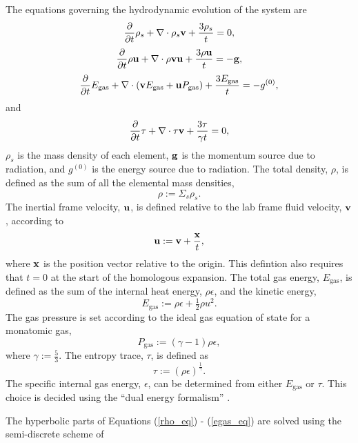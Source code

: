 \documentclass[preprint]{aastex62}
\newcommand{\pderiv}[2]{\frac{\partial}{\partial #2} #1}
\newcommand{\vect}[1]{{\bf #1}}
\newcommand{\diverg}[1]{ \vect{\nabla} \cdot #1 }
\newcommand{\eqs}[2]{Equations (\ref{#1}) - (\ref{#2})}
\begin{document}
The equations governing the hydrodynamic evolution of the system are
\begin{equation}
\label{rho_eq}
\pderiv{\rho_s}{t} + \diverg{\rho_s \vect{v}} + \frac{3 \rho_s}{t}  = 0,
\end{equation}
\begin{equation}
\label{mom_eq}
\pderiv{\rho \vect{u}}{t} + \diverg{\rho \vect{v}  \vect{u}}  + \frac{3 \rho  \vect{u}}{t}  = -\vect{g},
\end{equation}
\begin{equation}
\label{egas_eq}
\pderiv{E_\mathrm{gas}}{t} + \diverg{\left(\vect{v} E_\mathrm{gas} + \vect{u} P_\mathrm{gas}\right)}  + \frac{3 E_\mathrm{gas}}{t}  = -g^{\left(0\right)},
\end{equation}
and
\begin{equation}
\label{tau_eq}
\pderiv{\tau}{t} + \diverg{\tau \vect{v}} + \frac{3 \tau}{\gamma t}  = 0,
\end{equation}
$\rho_s$ is the mass density of each element, $\vect{g}$ is the momentum source due to radiation, and $g^{\left(0\right)}$ is the energy source due to radiation. The total density, $\rho$, is defined as the sum of all the elemental mass densities, 
\begin{equation}
\rho := \Sigma_s \rho_s.
\end{equation} 
The inertial frame velocity, $\vect{u}$, is defined relative to the lab frame fluid velocity, $\vect{v}$, according to
\begin{equation}
\vect{u} := \vect{v} + \frac{\vect{x}}{t},
\end{equation}
where $\vect{x}$ is the position vector relative to the origin. This defintion also requires that $t=0$ at the start of the homologous expansion. The total gas energy, $E_\mathrm{gas}$, is defined as the sum of the internal heat energy, $\rho \epsilon$, and the kinetic
energy,
\begin{equation}
E_\mathrm{gas} := \rho \epsilon + \tfrac{1}{2} \rho u^2.
\end{equation}
The gas pressure is set according to the ideal gas equation of state for a monatomic gas, 
\begin{equation}
P_\mathrm{gas} := \left(\gamma -1\right) \rho \epsilon,
\end{equation}
where $\gamma := \tfrac{5}{3}$. The entropy trace, $\tau$, is defined as 
\begin{equation}
\tau := \left( \rho \epsilon \right)^{\tfrac{1}{\gamma}}.
\end{equation}
The specific internal gas energy, $\epsilon$, can be determined from either $E_\mathrm{gas}$ or $\tau$. This choice is decided using the ``dual energy formalism'' \cite{ROKC1993}.

The hyperbolic parts of \eqs{rho_eq}{egas_eq} are solved using the semi-discrete scheme of \cite{KT2000}



\end{document}
